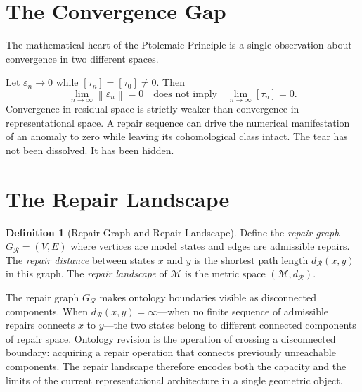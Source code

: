 \documentclass[12pt,oneside]{book}
\theoremstyle{plain}
\theoremstyle{definition}
\newtheorem{definition}[theorem]{Definition}
\theoremstyle{remark}
\newcommand{\R}{\mathcal{R}}
\newcommand{\M}{\mathcal{M}}
\newcommand{\eps}{\varepsilon}
\newcommand{\norm}[1]{\left\lVert #1 \right\rVert}
\newcommand{\1}{\mathbf{1}}
\begin{document}
\section{The Convergence Gap}

The mathematical heart of the Ptolemaic Principle is a single observation about convergence in two different spaces.

\begin{derivbox}[frametitle={Derivation: The Convergence Gap}]
Let $\eps_n \to 0$ while $[\tau_n] = [\tau_0] \neq 0$. Then
\[
\lim_{n\to\infty} \norm{\eps_n} = 0 \quad \text{does not imply} \quad \lim_{n\to\infty}[\tau_n] = 0.
\]
Convergence in residual space is strictly weaker than convergence in representational space. A repair sequence can drive the numerical manifestation of an anomaly to zero while leaving its cohomological class intact. The tear has not been dissolved. It has been hidden.
\end{derivbox}

\section{The Repair Landscape}

\begin{definition}[Repair Graph and Repair Landscape]
Define the \emph{repair graph} $G_{\R} = (V, E)$ where vertices are model states and edges are admissible repairs. The \emph{repair distance} between states $x$ and $y$ is the shortest path length $d_{\R}(x, y)$ in this graph. The \emph{repair landscape} of $\M$ is the metric space $(\M, d_{\R})$.
\end{definition}

\begin{derivbox}[frametitle={Derivation 8: The Repair Landscape}]
The repair graph $G_{\R}$ makes ontology boundaries visible as disconnected components. When $d_{\R}(x, y) = \infty$---when no finite sequence of admissible repairs connects $x$ to $y$---the two states belong to different connected components of repair space. Ontology revision is the operation of crossing a disconnected boundary: acquiring a repair operation that connects previously unreachable components. The repair landscape therefore encodes both the capacity and the limits of the current representational architecture in a single geometric object.
\end{derivbox}
\end{document}
